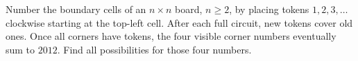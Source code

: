 Number the boundary cells of an $n\times n$ board, $n\ge2$, by placing tokens $1,2,3,\ldots$ clockwise starting at the top-left cell. After each full circuit, new tokens cover old ones. Once all corners have tokens, the four visible corner numbers eventually sum to $2012$. Find all possibilities for those four numbers.

